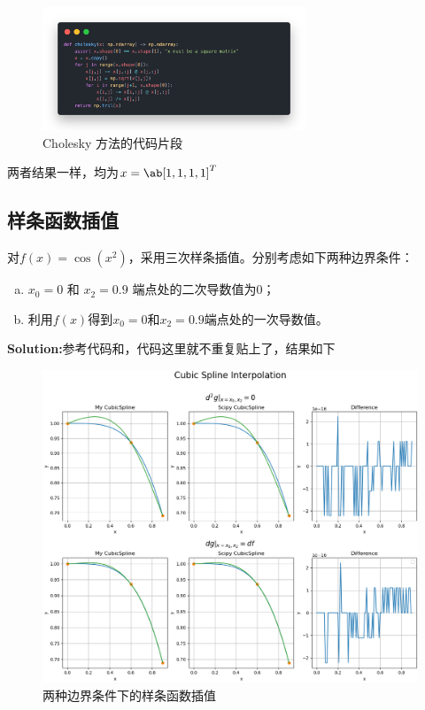 \documentclass[12pt, a4paper, oneside]{article}
\begin{document}
\begin{figure}
    \centering
    \includegraphics[width=0.7\textwidth]{fig2.png}
    \caption{Cholesky 方法的代码片段}
\end{figure}

两者结果一样，均为$x=\ab[1,1,1,1]^T$
\clearpage
\subsection{样条函数插值}
对$f(x)=\cos(x^2)$，采用三次样条插值。分别考虑如下两种边界条件：
\begin{enumerate}[(a)]
    \item $x_0=0$ 和 $x_2=0.9$ 端点处的二次导数值为$0$；
    \item 利用$f(x)$得到$x_0=0$和$x_2=0.9$端点处的一次导数值。
\end{enumerate}

\textbf{Solution:}参考代码和，代码这里就不重复贴上了，结果如下
\begin{figure}[h]
    \centering
    \includegraphics[width=1.0\textwidth]{fig3.png}
    \caption{两种边界条件下的样条函数插值}

\end{figure}
\end{document}
